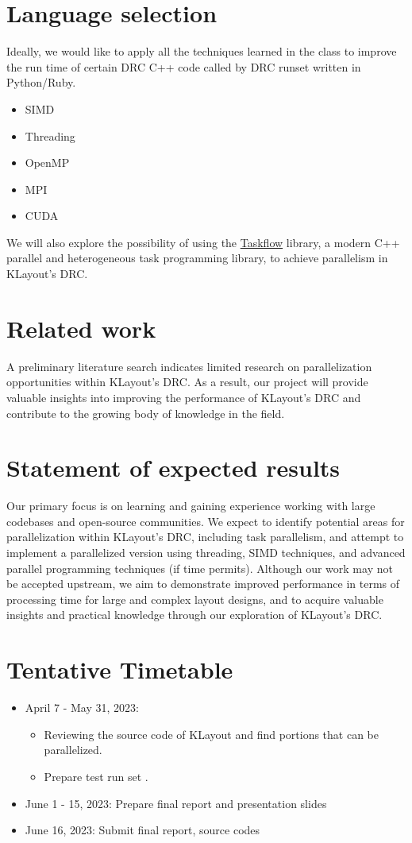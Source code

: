 \documentclass[sigconf]{acmart}
\begin{document}
\section{Language selection}
Ideally, we would like to apply all the techniques learned in the class to improve the run time of certain DRC C++ code called by DRC runset written in Python/Ruby.
\begin{itemize}
  \item SIMD
  \item Threading 
  \item OpenMP 
  \item MPI
  \item CUDA
\end{itemize}
We will also explore the possibility of using the \href{https://taskflow.github.io/}{Taskflow} library, a modern C++ parallel and heterogeneous task programming library, to achieve parallelism in KLayout's DRC.

\section{Related work}
A preliminary literature search indicates limited research on parallelization opportunities within KLayout's DRC. As a result, our project will provide valuable insights into improving the performance of KLayout's DRC and contribute to the growing body of knowledge in the field.

\section{Statement of expected results}
Our primary focus is on learning and gaining experience working with large codebases and open-source communities. We expect to identify potential areas for parallelization within KLayout's DRC, including task parallelism, and attempt to implement a parallelized version using threading, SIMD techniques, and advanced parallel programming techniques (if time permits). Although our work may not be accepted upstream, we aim to demonstrate improved performance in terms of processing time for large and complex layout designs, and to acquire valuable insights and practical knowledge through our exploration of KLayout's DRC.

\section{Tentative Timetable}
\begin{itemize}
    \item April 7 - May 31, 2023: 
    \begin{itemize}
      \item Reviewing the source code of KLayout and find portions that can be parallelized.
      \item Prepare test run set .
    \end{itemize}
    \item June 1 - 15, 2023: Prepare final report and presentation slides
    \item June 16, 2023: Submit final report, source codes
\end{itemize}
\end{document}

